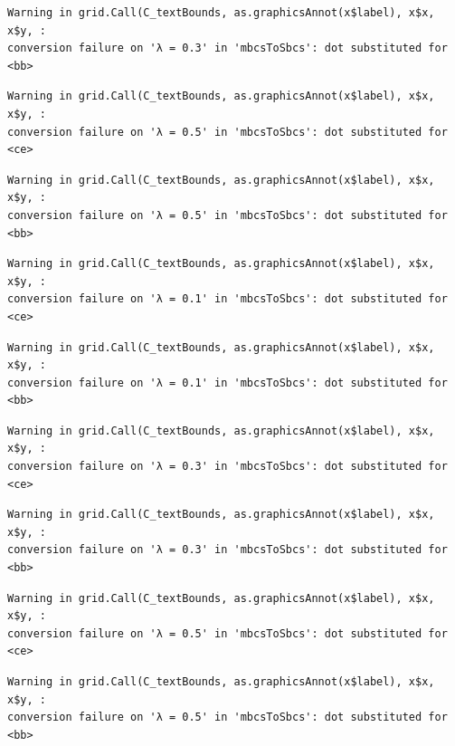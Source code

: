 \documentclass[
  spanish,
  a4paper,
]{scrreport}
\theoremstyle{plain}
\theoremstyle{definition}
\theoremstyle{definition}
\theoremstyle{remark}
\begin{document}
\begin{verbatim}
Warning in grid.Call(C_textBounds, as.graphicsAnnot(x$label), x$x, x$y, :
conversion failure on 'λ = 0.3' in 'mbcsToSbcs': dot substituted for <bb>
\end{verbatim}

\begin{verbatim}
Warning in grid.Call(C_textBounds, as.graphicsAnnot(x$label), x$x, x$y, :
conversion failure on 'λ = 0.5' in 'mbcsToSbcs': dot substituted for <ce>
\end{verbatim}

\begin{verbatim}
Warning in grid.Call(C_textBounds, as.graphicsAnnot(x$label), x$x, x$y, :
conversion failure on 'λ = 0.5' in 'mbcsToSbcs': dot substituted for <bb>
\end{verbatim}

\begin{verbatim}
Warning in grid.Call(C_textBounds, as.graphicsAnnot(x$label), x$x, x$y, :
conversion failure on 'λ = 0.1' in 'mbcsToSbcs': dot substituted for <ce>
\end{verbatim}

\begin{verbatim}
Warning in grid.Call(C_textBounds, as.graphicsAnnot(x$label), x$x, x$y, :
conversion failure on 'λ = 0.1' in 'mbcsToSbcs': dot substituted for <bb>
\end{verbatim}

\begin{verbatim}
Warning in grid.Call(C_textBounds, as.graphicsAnnot(x$label), x$x, x$y, :
conversion failure on 'λ = 0.3' in 'mbcsToSbcs': dot substituted for <ce>
\end{verbatim}

\begin{verbatim}
Warning in grid.Call(C_textBounds, as.graphicsAnnot(x$label), x$x, x$y, :
conversion failure on 'λ = 0.3' in 'mbcsToSbcs': dot substituted for <bb>
\end{verbatim}

\begin{verbatim}
Warning in grid.Call(C_textBounds, as.graphicsAnnot(x$label), x$x, x$y, :
conversion failure on 'λ = 0.5' in 'mbcsToSbcs': dot substituted for <ce>
\end{verbatim}

\begin{verbatim}
Warning in grid.Call(C_textBounds, as.graphicsAnnot(x$label), x$x, x$y, :
conversion failure on 'λ = 0.5' in 'mbcsToSbcs': dot substituted for <bb>
\end{verbatim}
\end{document}
